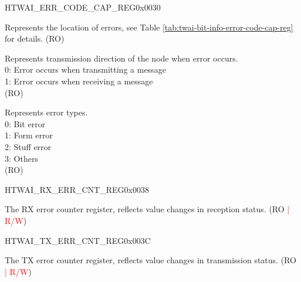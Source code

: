 \begin{register}{H}{TWAI\_ERR\_CODE\_CAP\_REG}{0x0030}\label{regdesc:TWAIERRCODECAPREG}
%
%
%
%
\regnewline%
\begin{regdesc}\begin{reglist}
\label{fielddesc:TWAIECCSEGMENT}\item [TWAI\_ECC\_SEGMENT] Represents the location of errors, see Table \ref{tab:twai-bit-info-error-code-cap-reg} for details. (RO)
\label{fielddesc:TWAIECCDIRECTION}\item [TWAI\_ECC\_DIRECTION] Represents transmission direction of the node when error occurs.\\
0: Error occurs when transmitting a message\\
1: Error occurs when receiving a message \\
(RO)
\label{fielddesc:TWAIECCTYPE}\item [TWAI\_ECC\_TYPE] Represents error types.\\
0: Bit error\\
1: Form error\\
2: Stuff error\\
3: Others \\
(RO)
\end{reglist}\end{regdesc}
\end{register}

\begin{register}{H}{TWAI\_RX\_ERR\_CNT\_REG}{0x0038}\label{regdesc:TWAIRXERRCNTREG}
%
%
\regnewline%
\begin{regdesc}\begin{reglist}
\label{fielddesc:TWAIRXERRCNT}\item [TWAI\_RX\_ERR\_CNT] The RX error counter register, reflects value changes in reception status. (RO \textcolor{red}{| R/W})
\end{reglist}\end{regdesc}
\end{register}


\begin{register}{H}{TWAI\_TX\_ERR\_CNT\_REG}{0x003C}\label{regdesc:TWAITXERRCNTREG}
%
%
\regnewline%
\begin{regdesc}\begin{reglist}
\label{fielddesc:TWAITXERRCNT}\item [TWAI\_TX\_ERR\_CNT] The TX error counter register, reflects value changes in transmission status. (RO \textcolor{red}{| R/W})
\end{reglist}\end{regdesc}
\end{register}


